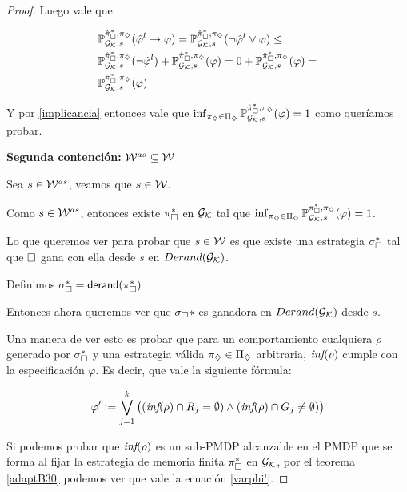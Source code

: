 \begin{proof}
	Luego vale que:

	\begin{align*}
		&\mathbb{P}_{\mathcal{G}_{\mathcal{K}},s}^{\hat{\pi}_{\square}^{*}, \pi_\diamondsuit}(\hat{\varphi}^l \rightarrow \varphi) = \mathbb{P}_{\mathcal{G}_{\mathcal{K}},s}^{\hat{\pi}_{\square}^{*}, \pi_\diamondsuit}(\neg \hat{\varphi}^l \vee \varphi) \leq \\
		&\mathbb{P}_{\mathcal{G}_{\mathcal{K}},s}^{\hat{\pi}_{\square}^{*}, \pi_\diamondsuit}(\neg \hat{\varphi}^l) + \mathbb{P}_{\mathcal{G}_{\mathcal{K}},s}^{\hat{\pi}_{\square}^{*}, \pi_\diamondsuit}(\varphi) = 0 + \mathbb{P}_{\mathcal{G}_{\mathcal{K}},s}^{\hat{\pi}_{\square}^{*}, \pi_\diamondsuit}(\varphi) = \\
		&\mathbb{P}_{\mathcal{G}_{\mathcal{K}},s}^{\hat{\pi}_{\square}^{*}, \pi_\diamondsuit}(\varphi)
	\end{align*}

	Y por \ref{implicancia} entonces vale que $\inf_{\pi_\diamondsuit \in \Pi_\diamondsuit}
		\mathbb{P}_{\mathcal{G}_{\mathcal{K}},s}^{\hat{\pi}_{\square}^{*}, \pi_\diamondsuit}(\varphi) = 1$ como queríamos probar.


	\textbf{Segunda contención: } $\mathcal{W}^{as} \subseteq \mathcal{W}$

	Sea $s \in \mathcal{W}^{as}$, veamos que $s \in \mathcal{W}$.

	Como $s \in \mathcal{W}^{as}$, entonces existe $\pi_\square^*$ en $\mathcal{G}_{\mathcal{K}}$ tal que
	$\inf_{\pi_\diamondsuit \in \Pi_\diamondsuit}\mathbb{P}_{\mathcal{G}_{\mathcal{K}},s}^{\pi_\square^*, \pi_\diamondsuit}(\varphi) = 1$.

	Lo que queremos ver para probar que $s \in \mathcal{W}$ es que existe una estrategia
	$\sigma_\square^*$ tal que $\square$ gana con ella desde $s$ en $Derand(\mathcal{G}_{\mathcal{K}})$.

	Definimos $\sigma_\square^* = \textsf{derand}(\pi_\square^*)$

	Entonces ahora queremos ver que $\sigma_\square*$ es ganadora en $Derand(\mathcal{G}_{\mathcal{K}})$ desde
	$s$.

	Una manera de ver esto es probar que para un comportamiento cualquiera $\rho$
	generado por $\sigma_\square^*$ y una estrategia válida $\pi_\diamondsuit \in \Pi_\diamondsuit$
	arbitraria, $\textit{inf}(\rho)$ cumple con la especificación $\varphi$. Es decir, que
	vale la siguiente fórmula:


	\begin{equation}
		\label{varphi'}
		\varphi' := \bigvee_{j = 1}^{k} \left((\textit{inf}(\rho) \cap R_j = \emptyset) \wedge (\textit{inf}(\rho) \cap G_j \neq \emptyset)  \right)
	\end{equation}

	Si podemos probar que $\textit{inf}(\rho)$ es un sub-PMDP alcanzable en el PMDP que se
	forma al fijar la estrategia de memoria finita $\pi_\square^*$ en $\mathcal{G}_{\mathcal{K}}$, por el
	teorema \ref{adaptB30} podemos ver que vale la ecuación \ref{varphi'}.


\end{proof}
